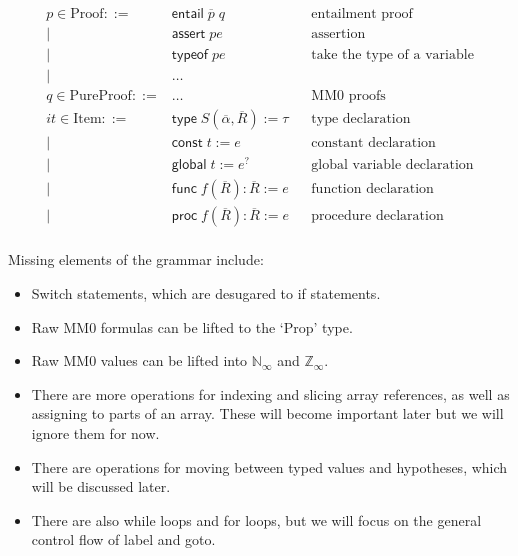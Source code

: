 \documentclass[acmsmall,nonacm]{acmart}
\newcommand*{\N}{\mathbb{N}}
\newcommand*{\Z}{\mathbb{Z}}
\begin{document}
\begin{align*}
  p \in \mathrm{Proof} ::={}&\mathsf{entail}\;\overline{p}\;q&&\mbox{entailment proof}\\
    \mid{}&\mathsf{assert}\;pe&&\mbox{assertion}\\
    \mid{}&\mathsf{typeof}\;pe&&\mbox{take the type of a variable}\\
    \mid{}&\dots\\
  q \in \mathrm{PureProof} ::={}&\dots&&\mbox{MM0 proofs}\\
  it \in \mathrm{Item} ::={}&\mathsf{type}\;S(\overline{\alpha}, \overline{R}):=\tau&&\mbox{type declaration}\\
    \mid{}&\mathsf{const}\;t:=e&&\mbox{constant declaration}\\
    \mid{}&\mathsf{global}\;t:=e^?&&\mbox{global variable declaration}\\
    \mid{}&\mathsf{func}\;f(\overline{R}):\overline{R}:=e&&\mbox{function declaration}\\
    \mid{}&\mathsf{proc}\;f(\overline{R}):\overline{R}:=e&&\mbox{procedure declaration}\\
\end{align*}

Missing elements of the grammar include:
\begin{itemize}
  \item Switch statements, which are desugared to if statements.
  \item Raw MM0 formulas can be lifted to the `Prop' type.
  \item Raw MM0 values can be lifted into $\N_\infty$ and $\Z_\infty$.
  \item There are more operations for indexing and slicing array references, as well as assigning to parts of an array. These will become important later but we will ignore them for now.
  \item There are operations for moving between typed values and hypotheses, which will be discussed later.
  \item There are also \textsf{while} loops and \textsf{for} loops, but we will focus on the general control flow of \textsf{label} and \textsf{goto}.
\end{itemize}
\end{document}
